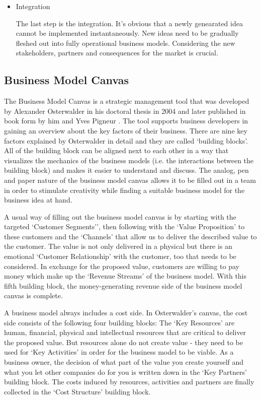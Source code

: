 \begin{itemize}
\begin{itemize}
\begin{itemize}
					\item Integration

					The last step is the integration. It's obvious that a newly genearated idea cannot be implemented instantaneously. New ideas need to be gradually fleshed out into fully operational business models. Considering the new stakeholders, partners and consequences for the market is crucial.


				\end{itemize}
			\end{itemize}
		\end{itemize}	
	\subsection{Business Model Canvas} 
		The Business Model Canvas is a strategic management tool that was developed by Alexander Osterwalder in his doctoral thesis in 2004 and later published in book form by him and Yves Pigneur \cite{bmc}. The tool supports business developers in gaining an overview about the key factors of their business. There are nine key factors explained by Osterwalder in detail and they are called `building blocks'. All of the building block can be aligned next to each other in a way that visualizes the mechanics of the business models (i.e. the interactions between the building block) and makes it easier to understand and discuss. The analog, pen and paper nature of the business model canvas allows it to be filled out in a team in order to stimulate creativity while finding a suitable business model for the business idea at hand.

		A usual way of filling out the business model canvas is by starting with the targeted `Customer Segments'', then following with the `Value Proposition' to these customers and the `Channels' that allow us to deliver the described value to the customer. The value is not only delivered in a physical but there is an emotional `Customer Relationship' with the customer, too that needs to be considered. In exchange for the proposed value, customers are willing to pay money which make up the `Revenue Streams' of the business model. With this fifth building block, the money-generating revenue side of the business model canvas is complete.

		A business model always includes a cost side. In Osterwalder's canvas, the cost side consists of the following four building blocks: The `Key Resources' are human, financial, physical and intellectual resources that are critical to deliver the proposed value. But resources alone do not create value - they need to be used for `Key Activities' in order for the business model to be viable. As a business owner, the decision of what part of the value you create yourself and what you let other companies do for you is written down in the `Key Partners' building block. The costs induced by resources, activities and partners are finally collected in the `Cost Structure' building block.

